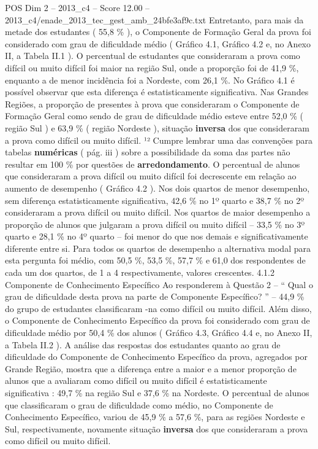 \begin{textsample}{POS Dim 2 – 2013\_c4 – Score 12.00 – 2013\_c4/enade\_2013\_tec\_gest\_amb\_24bfe3af9c.txt}
Entretanto, para mais da metade dos estudantes ( 55,8 \% ), o Componente de Formação Geral da prova foi considerado com grau de dificuldade médio ( Gráfico 4.1, Gráfico 4.2 e, no Anexo II, a Tabela II.1 ).
O percentual de estudantes que consideraram a prova como difícil ou muito difícil foi maior na região Sul, onde a proporção foi de 41,9 \%, enquanto a de menor incidência foi a Nordeste, com 26,1 \%.
No Gráfico 4.1 é possível observar que esta diferença é estatisticamente significativa.
Nas Grandes Regiões, a proporção de presentes à prova que consideraram o Componente de Formação Geral como sendo de grau de dificuldade médio esteve entre 52,0 \% ( região Sul ) e 63,9 \% ( região Nordeste ), situação \textbf{inversa} dos que consideraram a prova como difícil ou muito difícil. ¹² Cumpre lembrar uma das convenções para tabelas \textbf{numéricas} ( pág. iii ) sobre a possibilidade da soma das partes não resultar em 100 \% por questões de \textbf{arredondamento}.
O percentual de alunos que consideraram a prova difícil ou muito difícil foi decrescente em relação ao aumento de desempenho ( Gráfico 4.2 ).
Nos dois quartos de menor desempenho, sem diferença estatisticamente significativa, 42,6 \% no 1º quarto e 38,7 \% no 2º consideraram a prova difícil ou muito difícil.
Nos quartos de maior desempenho a proporção de alunos que julgaram a prova difícil ou muito difícil – 33,5 \% no 3º quarto e 28,1 \% no 4º quarto – foi menor do que nos demais e significativamente diferente entre si.
Para todos os quartos de desempenho a alternativa modal para esta pergunta foi médio, com 50,5 \%, 53,5 \%, 57,7 \% e 61,0 dos respondentes de cada um dos quartos, de 1 a 4 respectivamente, valores crescentes. 4.1.2 Componente de Conhecimento Específico Ao responderem à Questão 2 – “ Qual o grau de dificuldade desta prova na parte de Componente Específico? ” – 44,9 \% do grupo de estudantes classificaram -na como difícil ou muito difícil.
Além disso, o Componente de Conhecimento Específico da prova foi considerado com grau de dificuldade médio por 50,4 \% dos alunos ( Gráfico 4.3, Gráfico 4.4 e, no Anexo II, a Tabela II.2 ).
A análise das respostas dos estudantes quanto ao grau de dificuldade do Componente de Conhecimento Específico da prova, agregados por Grande Região, mostra que a diferença entre a maior e a menor proporção de alunos que a avaliaram como difícil ou muito difícil é estatisticamente significativa : 49,7 \% na região Sul e 37,6 \% na Nordeste.
O percentual de alunos que classificaram o grau de dificuldade como médio, no Componente de Conhecimento Específico, variou de 45,9 \% a 57,6 \%, para as regiões Nordeste e Sul, respectivamente, novamente situação \textbf{inversa} dos que consideraram a prova como difícil ou muito difícil.

\end{textsample}
